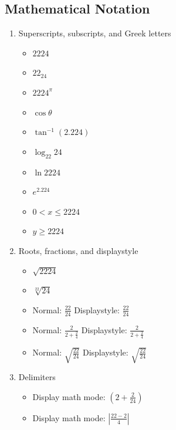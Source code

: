\documentclass{article}
\begin{document}
\subsection{Mathematical Notation}


\begin{enumerate}
    \item Superscripts, subscripts, and Greek letters
    \begin{itemize}
        \item $2224$
        \item $22_{24}$
        \item $2224^{\pi}$
        \item $\cos \theta$
        \item $\tan^{-1}(2.224)$
        \item $\log_{22}24$
        \item $\ln 2224$
        \item $e^{2.224}$
        \item $0 < x \leq 2224$
        \item $y \geq 2224$
    \end{itemize}

    \item Roots, fractions, and displaystyle
    \begin{itemize}
        \item $\sqrt{2224}$
        \item $\sqrt[22]{24}$
        \item Normal: $\frac{22}{24}$ Displaystyle: $\displaystyle\frac{22}{24}$
        \item Normal: $\frac{2}{2+ \frac{2}{4}}$ Displaystyle: $\displaystyle\frac{2}{2+ \frac{2}{4}}$
        \item Normal: $\sqrt{\frac{22}{24}}$ Displaystyle: $\displaystyle\sqrt{\frac{22}{24}}$
    \end{itemize}

    \item Delimiters
    \begin{itemize}
        \item Display math mode: $\displaystyle\left(2 + \frac{2}{24}\right)$
        \item Display math mode: $\displaystyle\left|\frac{22 - 2}{4}\right|$
    \end{itemize}


\end{enumerate}
\end{document}
